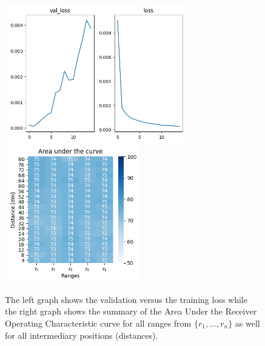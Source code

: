 \begin{multicols}{2}
\begin{itemize}
\end{itemize}
\end{multicols}\begin{figure}[H]%
\centering
\includegraphics[width=8cm,height=6cm]{3_models/models_29/graph_29.png}
\hspace{0.2 cm}
\includegraphics[width=6cm,height=6cm]{4_plots/plots_29/AUC_29.png}
\caption{The left graph shows the validation versus the training loss while the right graph shows the summary of the Area Under the Receiver Operating Characteristic curve for all ranges from $\{r_{1}, ... ,r_{n}\}$ as well for all intermediary positions (distances).}
\label{auc_29}
\end{figure}



\newpage

